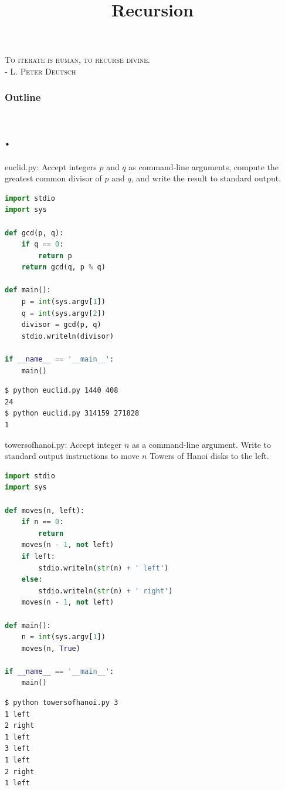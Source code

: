 \documentclass[8pt,a4paper,compress,handout]{beamer}
\title{Recursion}
\date{}
\begin{document}
\begin{frame}
\begin{flushright}
\tiny \textsc{To iterate is human, to recurse divine. \\ - L. Peter Deutsch}
\end{flushright}
\titlepage
\end{frame}

\begin{frame}
\frametitle{Outline}
\tableofcontents
\end{frame}

\section{.}
\begin{frame}[fragile]
\begin{framed}
\tiny euclid.py: Accept integers $p$ and $q$ as command-line arguments, compute the greatest common divisor of $p$ and $q$, and write the result to standard output.
\end{framed}

\begin{lstlisting}[language=Python]
import stdio
import sys

def gcd(p, q):
    if q == 0:
        return p
    return gcd(q, p % q)

def main():
    p = int(sys.argv[1])
    q = int(sys.argv[2])
    divisor = gcd(p, q)
    stdio.writeln(divisor)

if __name__ == '__main__':
    main()
\end{lstlisting}

\begin{lstlisting}[language={}]
$ python euclid.py 1440 408
24
$ python euclid.py 314159 271828
1
\end{lstlisting}
\end{frame}

\begin{frame}[fragile]
\begin{framed}
\tiny towersofhanoi.py: Accept integer $n$ as a command-line argument. Write to standard output instructions to move $n$ Towers of Hanoi disks to the left.
\end{framed}

\begin{lstlisting}[language=Python]
import stdio
import sys

def moves(n, left):
    if n == 0:
        return
    moves(n - 1, not left)
    if left:
        stdio.writeln(str(n) + ' left')
    else:
        stdio.writeln(str(n) + ' right')
    moves(n - 1, not left)

def main():
    n = int(sys.argv[1])
    moves(n, True)

if __name__ == '__main__':
    main()
\end{lstlisting}

\begin{lstlisting}[language={}]
$ python towersofhanoi.py 3
1 left
2 right
1 left
3 left
1 left
2 right
1 left
\end{lstlisting}
\end{frame}
\end{document}
